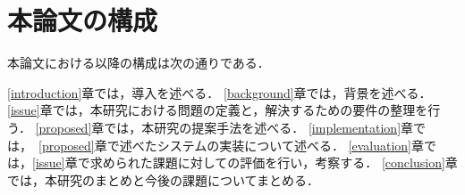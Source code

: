 \section{本論文の構成}

本論文における以降の構成は次の通りである．

\ref{introduction}章では，導入を述べる．
\ref{background}章では，背景を述べる．
\ref{issue}章では，本研究における問題の定義と，解決するための要件の整理を行う．
\ref{proposed}章では，本研究の提案手法を述べる．
\ref{implementation}章では，~\ref{proposed}章で述べたシステムの実装について述べる．
\ref{evaluation}章では，\ref{issue}章で求められた課題に対しての評価を行い，考察する．
\ref{conclusion}章では，本研究のまとめと今後の課題についてまとめる．


